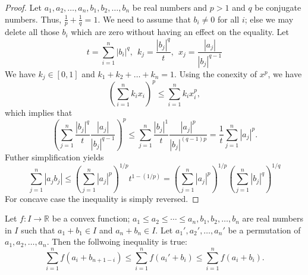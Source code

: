 \begin{proof}
  Let $a_1, a_2, \ldots, a_n, b_1, b_2, \ldots, b_n$ be real numbers and $p>1$ and $q$ be conjugate numbers. Thus, $\frac{1}{p} +
  \frac{1}{q} = 1.$ We need to assume that $b_i\neq 0$ for all $i$; else we may delete all those $b_i$ which are zero without
  having an effect on the equality. Let
  $$t = \sum_{i=1}^n|b_i|^q,~~k_j = \frac{|b_j|^q}{t},~~x_j = \frac{|a_j|}{|b_j|^{q - 1}}$$
  We have $k_j\in[0, 1]$ and $k_1 + k_2 + \ldots + k_n = 1$. Using the conexity of $x^p$, we have
  $$\left(\sum_{i=1}^nk_ix_i\right)^p\leq\sum_{i=1}^nk_ix_i^p,$$
  which implies that
  $$\left(\sum_{j=1}^n\frac{|b_j|^q}{t}\frac{|a_j|}{|b_j|^{q - 1}}\right)^p \leq
  \sum_{j=1}^n\frac{|b_j|^1}{t}\frac{|a_j|^p}{|b_j|^{(q - 1)p}} = \frac{1}{t}\sum_{j=1}^n|a_j|^p.$$
  Futher simplification yields
  $$\sum_{j=1}^n|a_jb_j|\leq\left(\sum_{j=1}^n|a_j|^p\right)^{1/p}t^{1 - (1/p)} =
  \left(\sum_{j=1}^n|a_j|^p\right)^{1/p}\left(\sum_{j=1}^n|b_j|^q\right)^{1/q}$$
  For concave case the inequality is simply reversed.
\end{proof}

\begin{theorem}
  Let $f:I\rightarrow\mathbb{R}$ be a convex function; $a_1\leq a_2\leq\cdots\leq a_n, b_1, b_2, \ldots, b_n$ are real numbers in
  $I$ such that $a_1 + b_1\in I$ and $a_n + b_n\in I$. Let $a_1', a_2', \ldots, a_n'$ be a permutation of $a_1, a_2, \ldots,
  a_n$. Then the follwoing inequality is true: $$\sum_{i=1}^nf(a_i + b_{n+1-i})\leq\sum_{i=1}^nf(a_i' + b_i)\leq\sum_{i=1}^nf(a_i +
  b_i).$$
\end{theorem}

